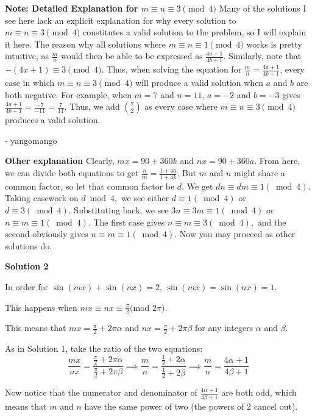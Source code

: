 \begin{enumerate}
 \textbf{Note: Detailed Explanation for $m \equiv n \equiv 3 \pmod 4$} Many of the solutions I see here lack an explicit explanation for why every solution to $m \equiv n \equiv 3 \pmod 4$ constitutes a valid solution to the problem, so I will explain it here. The reason why all solutions where $m \equiv n \equiv 1 \pmod 4$ works is pretty intuitive, as $\frac{m}{n}$ would then be able to be expressed as $\frac{4a + 1}{4b + 1}$. Similarly, note that $-(4x + 1) \equiv 3 \pmod 4$. Thus, when solving the equation for $\frac{m}{n} = \frac{4a + 1}{4b + 1}$, every case in which $m \equiv n \equiv 3 \pmod 4$ will produce a valid solution when $a$ and $b$ are both negative. For example, when $m = 7$ and $n = 11$, $a = -2$ and $b = -3$ gives $\frac{4a + 1}{4b + 1} = \frac{-7}{-11} = \frac{7}{11}$. Thus, we add $\binom 72$ as every case where $m \equiv n \equiv 3 \pmod 4$ produces a valid solution.

 - yangomango

 


 \textbf{Other explanation} Clearly, $mx = 90+360k$ and $nx=90+360a$. From here, we can divide both equations to get $\frac{n}{m} = \frac{1+4a}{1+4k}.$ But $m$ and $n$ might share a common factor, so let that common factor be $d.$ We get $dn \equiv dm \equiv 1 (\bmod 4).$ Taking casework on $d \bmod 4,$ we see either $d \equiv 1 (\bmod 4)$ or $d \equiv 3 (\bmod 4).$ Substituting back, we see $3n \equiv 3m \equiv 1 (\bmod 4)$ or $n \equiv m \equiv 1 (\bmod 4).$ The first case gives $n \equiv m \equiv 3 (\bmod 4),$ and the second obviously gives $n \equiv m \equiv 1 (\bmod 4).$ Now you may proceed as other solutions do. 

 



\textbf{Solution 2}

In order for $\sin(mx) + \sin(nx) = 2$, $\sin(mx) = \sin(nx) = 1$. 

 This happens when $mx \equiv nx \equiv \frac{\pi}{2} ($mod $2\pi).$

 This means that $mx = \frac{\pi}{2} + 2\pi\alpha$ and $nx = \frac{\pi}{2} + 2\pi\beta$ for any integers $\alpha$ and $\beta$. 

 As in Solution 1, take the ratio of the two equations:
 \[\frac{mx}{nx} = \frac{\frac{\pi}{2}+2\pi\alpha}{\frac{\pi}{2}+2\pi\beta} \implies \frac{m}{n} = \frac{\frac{1}{2}+2\alpha}{\frac{1}{2}+2\beta} \implies \frac{m}{n} = \frac{4\alpha+1}{4\beta+1}\]

 Now notice that the numerator and denominator of $\frac{4\alpha+1}{4\beta+1}$ are both odd, which means that $m$ and $n$ have the same power of two (the powers of 2 cancel out).


\end{enumerate}
